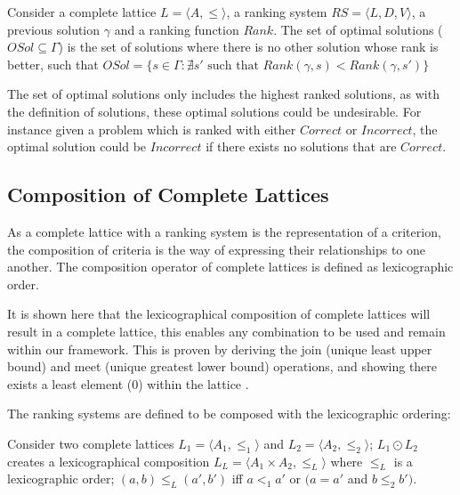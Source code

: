 \begin{defs}
Consider a complete lattice $L = \langle A, \leq \rangle$, a ranking system $RS = \langle L, D, V \rangle$, a previous solution $\gamma$ and a ranking function $Rank$.
The set of optimal solutions ($OSol \subseteq \Gamma$) is the set of solutions where there is no other solution whose rank is better,
such that $OSol = \{ s \in \Gamma : \nexists s' \mbox{ such that } Rank(\gamma,s) < Rank(\gamma,s')\}$
\end{defs}

The set of optimal solutions only includes the highest ranked solutions,
as with the definition of solutions, these optimal solutions could be undesirable.
For instance given a problem which is ranked with either $Correct$ or $Incorrect$, 
the optimal solution could be $Incorrect$ if there exists no solutions that are $Correct$. 

\subsection{Composition of Complete Lattices}
\label{sec:composition}
As a complete lattice with a ranking system is the representation of a criterion,
the composition of criteria is the way of expressing their relationships to one another. 
The composition operator of complete lattices is defined as lexicographic order.

It is shown here that the lexicographical composition of complete lattices will result in a complete lattice,
this enables any combination to be used and remain within our framework.
This is proven by deriving the join (unique least upper bound) and meet (unique greatest lower bound) operations,
and showing there exists a least element ($0$) within the lattice \cite{davey1990introduction}. 

The ranking systems are defined to be composed with the lexicographic ordering:
\begin{defs}
\label{def:lex_order}
Consider two complete lattices $L_1 = \langle A_1, \leq_1 \rangle$ and $L_2 = \langle A_2, \leq_2 \rangle$;
$L_1 \odot L_2$ creates a lexicographical composition  $L_L = \langle A_1 \times A_2, \leq_L \rangle$
where $\leq_L$ is a lexicographic order;
$(a,b) \leq_{L} (a',b')$ iff $a <_{1} a'$ or $(a = a'$ and $b \leq_{2} b')$.
\end{defs}

